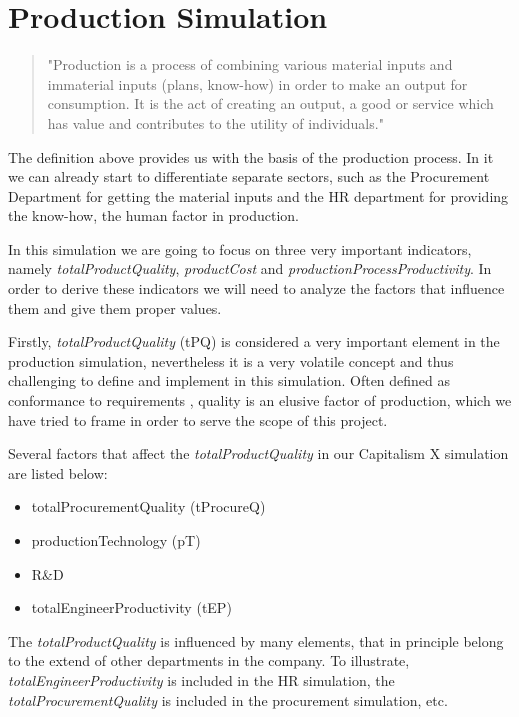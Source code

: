 \section{Production Simulation}
\label{sec:productionSim}
 \begin{quotation}
"Production is a process of combining various material inputs and immaterial inputs (plans, know-how) in order to make an output for consumption. It is the act of creating an output, a good or service which has value and contributes to the utility of individuals."\cite{noauthor_production_2019}
 \end{quotation}
The definition above provides us with the basis of the production process. In it we can already start to differentiate separate sectors, such as the Procurement Department for getting the material inputs and the HR department for providing the know-how, the human factor in production. 

In this simulation we are going to focus on three very important indicators, namely \textit{totalProductQuality}, \textit{productCost} and \textit{productionProcessProductivity}. In order to derive these indicators we will need to analyze the factors that influence them and give them proper values. 

Firstly, \textit{totalProductQuality} (\gls{tPQ}) is considered a very important element in the production simulation, nevertheless it is a very volatile concept and thus challenging to define and implement in this simulation. Often defined as conformance to requirements \cite{crosby_quality_1979}, quality is an elusive factor of production, which we have tried to frame in order to serve the scope of this project.

 Several factors that affect the \textit{totalProductQuality} in our Capitalism X simulation are listed below:
\begin{itemize}
\item totalProcurementQuality (tProcureQ)
\item productionTechnology (\gls{pT})
\item R\&D
\item totalEngineerProductivity (\gls{tEP}) 
\end{itemize}
The \textit{totalProductQuality} is influenced by many elements, that in principle belong to the extend of other departments in the company. To illustrate, \textit{totalEngineerProductivity} is included in the HR simulation, the \textit{totalProcurementQuality} is included in the procurement simulation, etc. 

